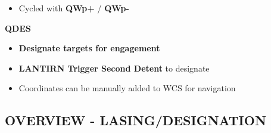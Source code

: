 \documentclass[fontMetropolis]{TechCheck}
\begin{document}
\begin{tableitemize}
{\begin{subitemize}
\begin{itemize}
				\item Cycled with \textbf{QWp+} / \textbf{QWp-}
			\end{itemize}
			\item \textbf{QDES}
			\begin{itemize}
				\item \textbf{Designate targets for engagement}
				\item \textbf{LANTIRN Trigger Second Detent} to designate
				\item Coordinates can be manually added to WCS for navigation
			\end{itemize}
		\end{subitemize}}
	\end{tableitemize}

	\clearpage

	\subsection{OVERVIEW - LASING/DESIGNATION}
	\label{subsec:lantirnlasingdesignation}
\end{document}
